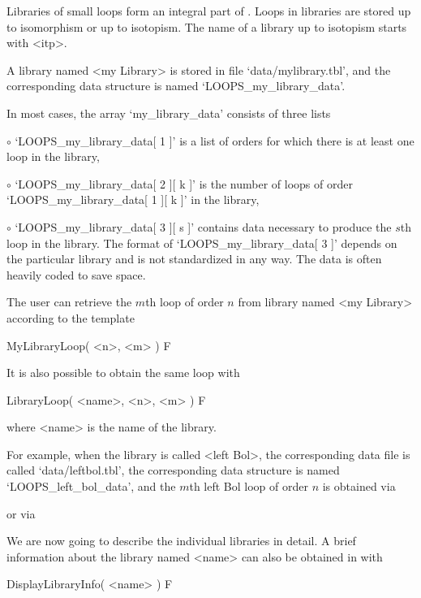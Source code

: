 
\label{lib} Libraries of small loops form an integral part of {\LOOPS}. Loops
in libraries are stored up to isomorphism or up to isotopism. The name of a
library up to isotopism starts with <itp>.


A library named <my Library> is stored in file `data/mylibrary.tbl', and the
corresponding data structure is named `LOOPS_my_library_data'.

In most cases, the array `my_library_data' consists of three lists
\beginlist%
\item{$\circ$}
    `LOOPS_my_library_data[ 1 ]' is a list of orders for which there is at
    least one loop in the library,
\item{$\circ$}
    `LOOPS_my_library_data[ 2 ][ k ]' is the number of loops of order
    `LOOPS_my_library_data[ 1 ][ k ]' in the library,
\item{$\circ$}
    `LOOPS_my_library_data[ 3 ][ s ]' contains data necessary to produce the
    $s$th loop in the library.
\endlist
The format of `LOOPS_my_library_data[ 3 ]' depends on the particular library and is not standardized in any way. The data is often heavily coded to save space.

The user can retrieve the $m$th loop of order $n$ from library named <my
Library> according to the template

\>MyLibraryLoop( <n>, <m> ) F

It is also possible to obtain the same loop with

\>LibraryLoop( <name>, <n>, <m> ) F

where <name> is the name of the library.

For example, when the library is called <left Bol>, the corresponding data file
is called `data/leftbol.tbl', the corresponding data structure is named
`LOOPS_left_bol_data', and the $m$th left Bol loop of order $n$ is obtained via


or via


We are now going to describe the individual libraries in detail. A brief
information about the library named <name> can also be obtained in {\LOOPS}
with

\>DisplayLibraryInfo( <name> ) F

